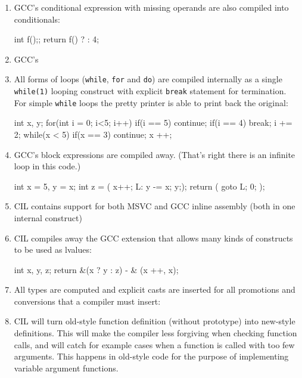 \documentclass{article}
\def\t#1{{\tt #1}}
\begin{document}
\begin{enumerate}
\item GCC's conditional expression with missing operands are also compiled
into conditionals:
\begin{cilcode}[local]
  int f();;
  return f() ? : 4;
\end{cilcode}

\item GCC's 

\item All forms of loops (\t{while}, \t{for} and \t{do}) are compiled
internally as a single \t{while(1)} looping construct with explicit \t{break}
statement for termination. For simple \t{while} loops the pretty printer is
able to print back the original:
\begin{cilcode}[local]
   int x, y;
   for(int i = 0; i<5; i++) {
      if(i == 5) continue;
      if(i == 4) break;
      i += 2;
   } 
   while(x < 5) {
     if(x == 3) continue;
     x ++;
   }
\end{cilcode}

\item GCC's block expressions are compiled away. (That's right there is an
infinite loop in this code.)

\begin{cilcode}[local]
   int x = 5, y = x;
   int z = ({ x++; L: y -= x; y;});
   return ({ goto L; 0; });
\end{cilcode}

\item CIL contains support for both MSVC and GCC inline assembly (both in one
internal construct)

\item CIL compiles away the GCC extension that allows many kinds of constructs
to be used as lvalues:

\begin{cilcode}[local]
   int x, y, z;
   return &(x ? y : z) - & (x ++, x);
\end{cilcode}

\item All types are computed and explicit casts are inserted for all
promotions and conversions that a compiler must insert:

\item CIL will turn old-style function definition (without prototype) into
new-style definitions. This will make the compiler less forgiving when
checking function calls, and will catch for example cases when a function is
called with too few arguments. This happens in old-style code for the purpose
of implementing variable argument functions.
 

\end{enumerate}
\end{document}
